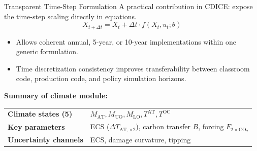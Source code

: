 \documentclass[aspectratio=169,11pt]{beamer}
\begin{document}
\begin{frame}{Transparent Time-Step Formulation}
\small
A practical contribution in CDICE: expose the time-step scaling directly in equations.
\[
X_{t+\Delta t} = X_t + \Delta t \cdot f(X_t, u_t; \theta)
\]

\begin{itemize}
    \item Allows coherent annual, 5-year, or 10-year implementations within one generic formulation.
    \item Time discretization consistency improves transferability between classroom code, production code, and policy simulation horizons.
\end{itemize}

\vspace{0.2cm}
\textbf{Summary of climate module:}
\begin{center}
\small
\begin{tabular}{ll}
\toprule
\textbf{Climate states (5)} & $M_{\mathrm{AT}}, M_{\mathrm{UO}}, M_{\mathrm{LO}}, T^{\mathrm{AT}}, T^{\mathrm{OC}}$ \\
\textbf{Key parameters} & ECS ($\Delta T_{\mathrm{AT},\times 2}$), carbon transfer $B$, forcing $F_{\mathrm{2\times CO_2}}$ \\
\textbf{Uncertainty channels} & ECS, damage curvature, tipping \\
\bottomrule
\end{tabular}
\end{center}
\end{frame}

\end{document}
